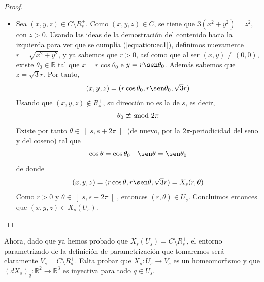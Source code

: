\documentclass[12pt]{article}
\newcommand{\R}{\mathbb{R}}
\newcommand{\Rmas}{\R^{+}}
\begin{document}
\begin{ejercicio}
\begin{enumerate}
\begin{proof}
\begin{itemize}
                    $$(x,y,z) = X_s(r, \theta) = (r \cos \theta, r \sen \theta, \sqrt{3}r)$$
                    Por un lado, $$x^2 + y^2 = r^2(\cos^2 \theta + \sen^2 \theta) = r^2$$
                    y por el otro $$z^2 = 3r^2$$
                    luego $3(x^2 + y^2) = z^2$, y como $r \in \Rmas$, $z = \sqrt{3} r > 0$, luego $(x,y,z) \in C$.  Como $\theta \in \left]s, s + 2\pi \right[$,
                    entonces $(x,y,z) \notin R_s^{+}$, luego $(x,y,z) \in C \setminus R_s^{+}$.
                    \item[$(\supseteq$] Sea $(x,y,z) \in C \setminus R_s^{+}$. Como $(x,y,z) \in C$, se tiene que $3(x^2 + y^2) = z^2$, con $z > 0$. Usando
                    las ideas de la demostración del contenido hacia la izquierda para ver que se cumplía (\ref{equation:ec1}), definimos nuevamente 
                    $r = \sqrt{x^2 + y^2}$, y ya sabemos que $r > 0$, así como que al ser $(x,y) \neq (0,0)$, existe $\theta_0 \in \R$ tal que
                    $x = r \cos \theta_0$ e $y = r \sen \theta_0$. Además sabemos que $z = \sqrt{3} r$. Por tanto, 
                    $$(x,y,z) = (r \cos \theta_0, r \sen \theta_0, \sqrt{3}r)$$
                    Usando que $(x,y,z) \notin R_s^{+}$, su dirección no es la de $s$, es decir, $$\theta_0 \not\equiv s \hspace{-0.3cm} \mod 2 \pi$$
                    Existe por tanto $\theta \in \left]s, s + 2\pi \right[$ (de nuevo, por la $2\pi$-periodicidad del seno y del coseno) tal que 
                    $$\cos \theta = \cos \theta_0 \quad \sen \theta = \sen \theta_0$$
                    de donde
                    $$(x,y,z) = (r \cos \theta, r \sen \theta, \sqrt{3} r) = X_s(r, \theta)$$
                    Como $r > 0$ y $\theta \in \left]s, s + 2\pi \right[$, entonces $(r, \theta) \in U_s$. Concluimos entonces que $(x,y,z) \in X_s(U_s)$. 
                    \qedhere 
                \end{itemize}
            \end{proof}
            Ahora, dado que ya hemos probado que $X_s(U_s) = C \setminus R_s^{+}$, el entorno parametrizado de la definición de parametrización que 
            tomaremos será claramente $V_s = C \setminus R_s^{+}$. Falta probar que $X_s : U_s \to V_s$ es un homeomorfismo y que $(dX_s)_q : \R^2 \to \R^3$
            es inyectiva para todo $q \in U_s$. \\


\end{enumerate}
\end{ejercicio}
\end{document}
